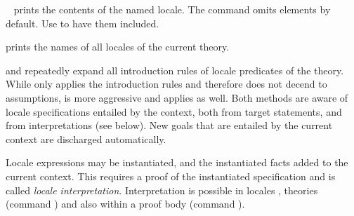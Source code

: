 \begin{isabellebody}
\begin{isamarkuptext}
\begin{description}
  \item \hyperlink{command.print-locale}{\mbox{}}~ prints the
  contents of the named locale.  The command omits \hyperlink{element.notes}{\mbox{}}
  elements by default.  Use \hyperlink{command.print-locale}{\mbox{}} to
  have them included.

  \item \hyperlink{command.print-locales}{\mbox{}} prints the names of all locales
  of the current theory.

  \item \hyperlink{method.intro-locales}{\mbox{}} and \hyperlink{method.unfold-locales}{\mbox{}}
  repeatedly expand all introduction rules of locale predicates of the
  theory.  While \hyperlink{method.intro-locales}{\mbox{}} only applies the  introduction rules and therefore does not decend to
  assumptions, \hyperlink{method.unfold-locales}{\mbox{}} is more aggressive and applies
   as well.  Both methods are aware of locale
  specifications entailed by the context, both from target statements,
  and from interpretations (see below).  New goals that are entailed
  by the current context are discharged automatically.

  \end{description}%
\end{isamarkuptext}%
\isamarkuptrue%
%
\isamarkuptrue%
%
\begin{isamarkuptext}%
Locale expressions may be instantiated, and the instantiated facts
  added to the current context.  This requires a proof of the
  instantiated specification and is called \emph{locale
  interpretation}.  Interpretation is possible in locales \hyperlink{command.sublocale}{\mbox{}}, theories (command \hyperlink{command.interpretation}{\mbox{}}) and
  also within a proof body (command \hyperlink{command.interpret}{\mbox{}}).


\end{isamarkuptext}
\end{isabellebody}
